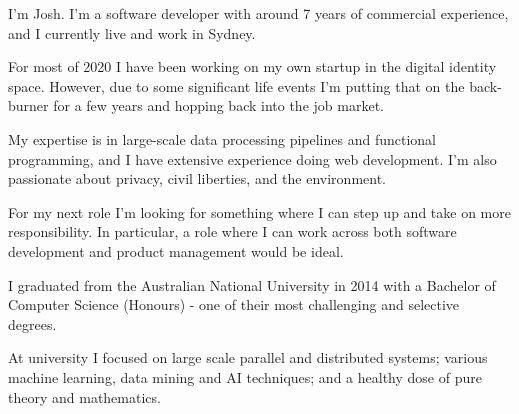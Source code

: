 


\begin{cvletter}
  I'm Josh. I’m a software developer with around 7 years of commercial experience, and I currently live and work in Sydney.

  For most of 2020 I have been working on my own startup in the digital identity space. However, due to some significant life events I'm putting that on the back-burner for a few years and hopping back into the job market.

  My expertise is in large-scale data processing pipelines and functional programming, and I have extensive experience doing web development. I'm also passionate about privacy, civil liberties, and the environment.

  For my next role I'm looking for something where I can step up and take on more responsibility. In particular, a role where I can work across both software development and product management would be ideal.

  I graduated from the Australian National University in 2014 with a Bachelor of Computer
  Science (Honours) - one of their most challenging and selective degrees.

  At university I focused on large scale parallel and distributed systems; various machine learning, data mining and AI techniques; and a healthy dose of pure theory and mathematics.

\end{cvletter}